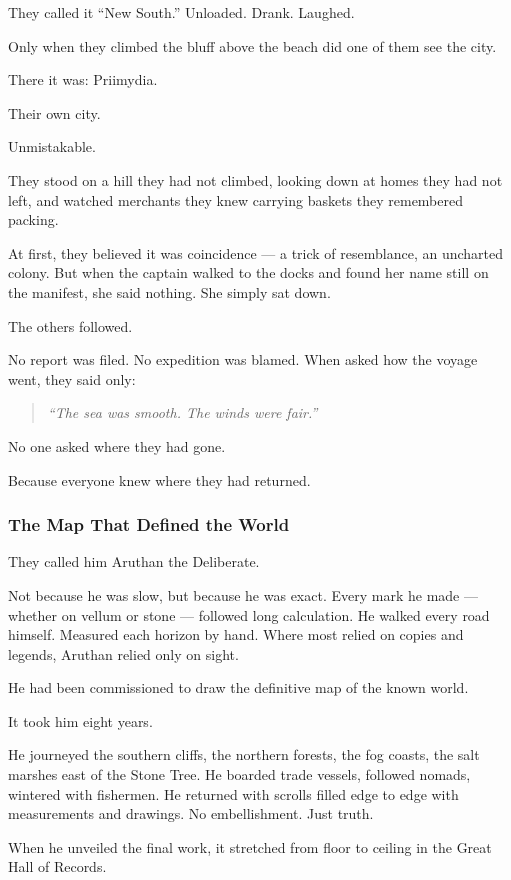 \documentclass[12pt]{article}
\begin{document}
They called it ``New South.'' Unloaded. Drank. Laughed.

Only when they climbed the bluff above the beach did one of them see the city.

There it was: Priimydia.

Their own city.

Unmistakable.

They stood on a hill they had not climbed, looking down at homes they had not left, and watched merchants they knew carrying baskets they remembered packing.

At first, they believed it was coincidence — a trick of resemblance, an uncharted colony. But when the captain walked to the docks and found her name still on the manifest, she said nothing. She simply sat down.

The others followed.

No report was filed. No expedition was blamed. When asked how the voyage went, they said only:

\begin{quote}
\emph{``The sea was smooth. The winds were fair.''}
\end{quote}

No one asked where they had gone.

Because everyone knew where they had returned.

\dotfill

\subsubsection*{The Map That Defined the World}

They called him Aruthan the Deliberate.

Not because he was slow, but because he was exact. Every mark he made — whether on vellum or stone — followed long calculation. He walked every road himself. Measured each horizon by hand. Where most relied on copies and legends, Aruthan relied only on sight.

He had been commissioned to draw the definitive map of the known world.

It took him eight years.

He journeyed the southern cliffs, the northern forests, the fog coasts, the salt marshes east of the Stone Tree. He boarded trade vessels, followed nomads, wintered with fishermen. He returned with scrolls filled edge to edge with measurements and drawings. No embellishment. Just truth.

When he unveiled the final work, it stretched from floor to ceiling in the Great Hall of Records.
\end{document}
